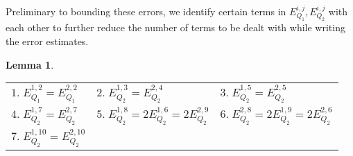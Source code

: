 \documentclass[sn-mathphys, Numbered ,a4paper]{sn-jnl}%
\theoremstyle{plain}
\newtheorem{lemma}[theorem]{Lemma}
\theoremstyle{definition}
\theoremstyle{remark}
\theoremstyle{plain}
\theoremstyle{definition}
\theoremstyle{remark}
\begin{document}
Preliminary to bounding these errors, we identify certain terms in $E_{Q_1}^{i,j}, E_{Q_2}^{i,j}$ with each other to further reduce the number of terms to be dealt with while writing the error estimates.

\begin{lemma}
{\renewcommand{\arraystretch}{1.5}
	\begin{tabular}[t]{lll}
		 $\mathit{1.}\; E_{Q_1}^{1,2} = E_{Q_1}^{2,2}$\quad\quad& 
		 $\mathit{2.}\; E_{Q_2}^{1,3} = E_{Q_2}^{2,4}$\quad\quad&
		 $\mathit{3.}\; E_{Q_2}^{1,5} = E_{Q_2}^{2,5}$ \quad\quad\\
		 $\mathit{4.}\; E_{Q_2}^{1,7} = E_{Q_2}^{2,7}$\quad\quad&
		 $\mathit{5.}\; E_{Q_2}^{1,8} = 2E_{Q_2}^{1,6} =  2E_{Q_2}^{2,9}$\quad\quad&
		 $\mathit{6.}\; E_{Q_2}^{2,8} = 2E_{Q_2}^{1,9} = 2E_{Q_2}^{2,6}$\quad\quad\\
		 $\mathit{7.}\; E_{Q_2}^{1,10} = E_{Q_2}^{2,10}$\quad\quad
		 
\end{tabular}}
\end{lemma}	 
\end{document}
